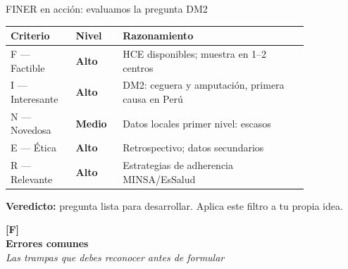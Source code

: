 \documentclass[12pt, aspectratio=169]{beamer}
\begin{document}
\begin{frame}{FINER en acción: evaluamos la pregunta DM2}
  \begin{examplebox}
    \footnotesize
    \begin{tabular}{@{}p{0.17\linewidth} p{0.13\linewidth} p{0.54\linewidth}@{}}
      \toprule
      \textbf{Criterio} & \textbf{Nivel} & \textbf{Razonamiento} \\
      \midrule
      F — Factible    & \textcolor{boxGreen}{\textbf{Alto}}   & HCE disponibles; muestra en 1--2 centros \\
      I — Interesante & \textcolor{boxGreen}{\textbf{Alto}}   & DM2: ceguera y amputación, primera causa en Perú \\
      N — Novedosa    & \textcolor{boxOrange}{\textbf{Medio}} & Datos locales primer nivel: escasos \\
      E — Ética       & \textcolor{boxGreen}{\textbf{Alto}}   & Retrospectivo; datos secundarios \\
      R — Relevante   & \textcolor{boxGreen}{\textbf{Alto}}   & Estrategias de adherencia MINSA/EsSalud \\
      \bottomrule
    \end{tabular}
  \end{examplebox}

  \vspace{2pt}
  \begin{keybox}
    \footnotesize
    \textbf{Veredicto:} pregunta lista para desarrollar. Aplica este filtro a tu propia idea.
  \end{keybox}
\end{frame}

\begin{frame}[plain]
  \vfill
  \centering
  \begin{tcolorbox}[colback=sfPrimary, colframe=sfPrimary,
                    width=0.72\textwidth, arc=4pt, boxrule=0pt,
                    left=12pt, right=12pt, top=10pt, bottom=10pt]
    \centering
    \color{white}
    \large\textbf{[F]}\\[4pt]
    \Large\textbf{Errores comunes}\\[8pt]
    \normalsize\textit{Las trampas que debes reconocer antes de formular}
  \end{tcolorbox}
  \vfill
\end{frame}
\end{document}
